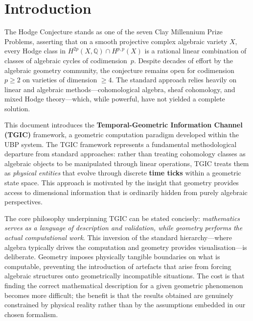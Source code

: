 \documentclass[11pt,a4paper]{article}
\theoremstyle{definition}
\theoremstyle{plain}
\newcommand{\QQ}{\mathbb{Q}}
\begin{document}

\tableofcontents
\newpage


\section{Introduction}\label{sec:intro}

The Hodge Conjecture stands as one of the seven Clay Millennium Prize Problems, asserting that on a smooth projective complex algebraic variety $X$, every Hodge class in $H^{2p}(X, \QQ) \cap H^{p,p}(X)$ is a rational linear combination of classes of algebraic cycles of codimension~$p$. Despite decades of effort by the algebraic geometry community, the conjecture remains open for codimension $p \geq 2$ on varieties of dimension $\geq 4$. The standard approach relies heavily on linear and algebraic methods---cohomological algebra, sheaf cohomology, and mixed Hodge theory---which, while powerful, have not yielded a complete solution.

This document introduces the \textbf{Temporal-Geometric Information Channel (TGIC)} framework, a geometric computation paradigm developed within the UBP system. The TGIC framework represents a fundamental methodological departure from standard approaches: rather than treating cohomology classes as algebraic objects to be manipulated through linear operations, TGIC treats them as \emph{physical entities} that evolve through discrete \textbf{time ticks} within a geometric state space. This approach is motivated by the insight that geometry provides access to dimensional information that is ordinarily hidden from purely algebraic perspectives.

The core philosophy underpinning TGIC can be stated concisely: \emph{mathematics serves as a language of description and validation, while geometry performs the actual computational work}. This inversion of the standard hierarchy---where algebra typically drives the computation and geometry provides visualisation---is deliberate. Geometry imposes physically tangible boundaries on what is computable, preventing the introduction of artefacts that arise from forcing algebraic structures onto geometrically incompatible situations. The cost is that finding the correct mathematical description for a given geometric phenomenon becomes more difficult; the benefit is that the results obtained are genuinely constrained by physical reality rather than by the assumptions embedded in our chosen formalism.
\end{document}
